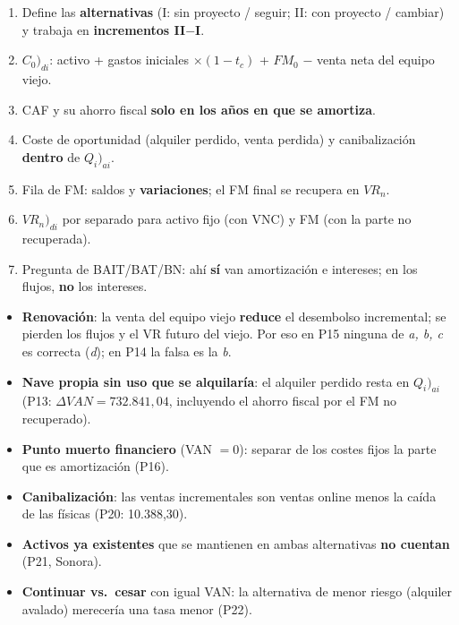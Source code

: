 \documentclass[10pt,a4paper,twoside]{article}
\newcommand{\di}{)_{di}}
\newcommand{\ai}{)_{ai}}
\begin{document}
\begin{examen}
\begin{enumerate}
  \item Define las \textbf{alternativas} (I: sin proyecto / seguir; II: con proyecto / cambiar) y trabaja en \textbf{incrementos II$-$I}.
  \item $C_0\di$: activo + gastos iniciales $\times(1-t_c)$ + $FM_0$ $-$ venta neta del equipo viejo.
  \item CAF y su ahorro fiscal \textbf{solo en los años en que se amortiza}.
  \item Coste de oportunidad (alquiler perdido, venta perdida) y canibalización \textbf{dentro} de $Q_i\ai$.
  \item Fila de FM: saldos y \textbf{variaciones}; el FM final se recupera en $VR_n$.
  \item $VR_n\di$ por separado para activo fijo (con VNC) y FM (con la parte no recuperada).
  \item Pregunta de BAIT/BAT/BN: ahí \textbf{sí} van amortización e intereses; en los flujos, \textbf{no} los intereses.
\end{enumerate}
\end{examen}

\begin{trampa}
\begin{itemize}
  \item \textbf{Renovación}: la venta del equipo viejo \textbf{reduce} el desembolso incremental; se pierden los flujos y el
        VR futuro del viejo. Por eso en P15 ninguna de \emph{a, b, c} es correcta (\emph{d}); en P14 la falsa es la \emph{b}.
  \item \textbf{Nave propia sin uso que se alquilaría}: el alquiler perdido resta en $Q_i\ai$ (P13: $\Delta VAN=732.841,04$,
        incluyendo el ahorro fiscal por el FM no recuperado).
  \item \textbf{Punto muerto financiero} (VAN $=0$): separar de los costes fijos la parte que es amortización (P16).
  \item \textbf{Canibalización}: las ventas incrementales son ventas online menos la caída de las físicas (P20: 10.388,30).
  \item \textbf{Activos ya existentes} que se mantienen en ambas alternativas \textbf{no cuentan} (P21, Sonora).
  \item \textbf{Continuar vs.~cesar} con igual VAN: la alternativa de menor riesgo (alquiler avalado) merecería una tasa menor (P22).
\end{itemize}
\end{trampa}
\end{document}
